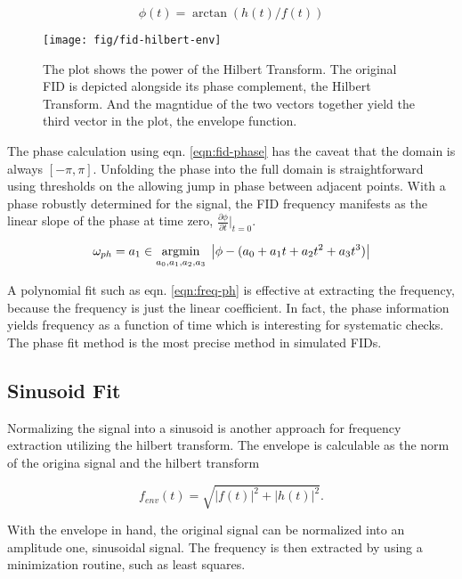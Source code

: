 \begin{equation}
\label{eqn:fid-phase}
\phi(t) = \arctan(h(t) / f(t))
\end{equation}

\begin{figure}
\texttt{[image: fig/fid-hilbert-env]}
\caption{
    The plot shows the power of the Hilbert Transform.  The original FID is depicted alongside its phase complement, the Hilbert Transform.  And the magntidue of the two vectors together yield the third vector in the plot, the envelope function.
    \label{fig:fid-hilbert-env}
}
\end{figure}

\noindent
The phase calculation using eqn. \ref{eqn:fid-phase} has the caveat that the domain is always $[-\pi, \pi]$.  Unfolding the phase into the full domain is straightforward using thresholds on the allowing jump in phase between adjacent points.  With a phase robustly determined for the signal, the FID frequency manifests as the linear slope of the phase at time zero, $\frac{\partial \phi}{\partial t}|_{t=0}$.

\begin{equation}
\label{eqn:freq-ph}
\omega_{ph} = a_1 \in \operatorname*{argmin}_{a_0, a_1, a_2, a_3} \;
\left| \phi - (a_0 + a_1 t + a_2 t^2 + a_3 t^3) \right|
\end{equation}

A polynomial fit such as eqn. \ref{eqn:freq-ph} is effective at extracting the frequency, because the frequency is just the linear coefficient.  In fact, the phase information yields frequency as a function of time which is interesting for systematic checks.  The phase fit method is the most precise method in simulated FIDs.

\subsection{Sinusoid Fit}
Normalizing the signal into a sinusoid is another approach for frequency extraction utilizing the hilbert transform.  The envelope is calculable as the norm of the origina signal and the hilbert transform

\begin{equation}
\label{eqn:fid-envelope}
f_{env}(t) = \sqrt{|f(t)|^2 + |h(t)|^2}.
\end{equation}

\noindent 
With the envelope in hand, the original signal can be normalized into an amplitude one, sinusoidal signal.  The frequency is then extracted by using a minimization routine, such as least squares.

